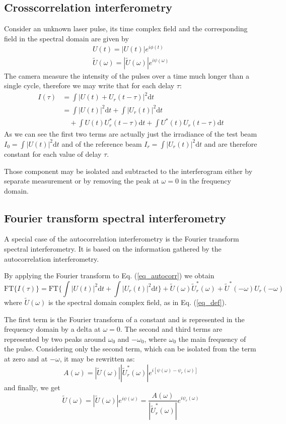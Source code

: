 \documentclass[12pt,a4paper,twoside]{article}
\begin{document}
\subsection{Crosscorrelation interferometry}
Consider an unknown laser pulse, its time complex field and the corresponding field in the spectral domain are given by
\begin{gather}
	U(t) = |U(t)|e^{i\phi(t)} \\
	\tilde{U}(\omega) = |\tilde{U}(\omega)|e^{i\psi(\omega)}
	\label{eq_def}
\end{gather}
The camera measure the intensity of the pulses over a time much longer than a single cycle, therefore we may write that for each delay $\tau$:
\begin{align}
	I(\tau) 	&= \int|U(t)+U_r(t-\tau)|^2\mathrm{d}t \\
			&= \int|U(t)|^2\mathrm{d}t + \int|U_r(t)|^2\mathrm{d}t\\
			&\quad + \int U(t)U_r^*(t-\tau)\mathrm{d}t + \int U^*(t)U_r(t-\tau)\mathrm{d}t 
	\label{eq_autocorr}
\end{align}
As we can see the first two terms are actually just the irradiance of the test beam $I_0 = \int|U(t)|^2\mathrm{d}t$ and of the reference beam $I_r = \int|U_r(t)|^2\mathrm{d}t$ and are therefore constant for each value of delay $\tau$.

Those component may be isolated and subtracted to the interferogram either by separate measurement or by removing the peak at $\omega = 0$ in the frequency domain.
\subsection{Fourier transform spectral interferometry}
A special case of the autocorrelation interferometry is the Fourier transform spectral interferometry.
It is based on the information gathered by the autocorrelation interferometry.

By applying the Fourier transform to Eq. (\ref{eq_autocorr}) we obtain
\begin{equation}
	\mathrm{FT}\lbrace I(\tau)\rbrace =
	\mathrm{FT}\lbrace\int|U(t)|^2\mathrm{d}t + \int|U_r(t)|^2\mathrm{d}t\rbrace
	+ \tilde{U}(\omega)\tilde{U}_r^*(\omega)
	+ \tilde{U}^*(-\omega)U_r(-\omega)
\end{equation}
where $\tilde{U}(\omega)$ is the spectral domain complex field, as in Eq. (\ref{eq_def}).

The first term is the Fourier transform of a constant and is represented in the frequency domain by a delta at $\omega = 0$.
The second and third terms are represented by two peaks around $\omega_0$ and $-\omega_0$, where $\omega_0$ the main frequency of the pulse.
Considering only the second term, which can be isolated from the term at zero and at $-\omega$, it may be rewritten as:
\begin{equation}
	A(\omega)=|\tilde{U}(\omega)||\tilde{U}_r^*(\omega)|e^{i[\psi(\omega)-\psi_r(\omega)]}
\end{equation}
and finally, we get
\begin{equation}
	\tilde{U}(\omega) = |\tilde{U}(\omega)|e^{i\psi(\omega)} = \frac{A(\omega)}{|\tilde{U}_r^*(\omega)|}e^{i\psi_r(\omega)}
\end{equation}
\end{document}
